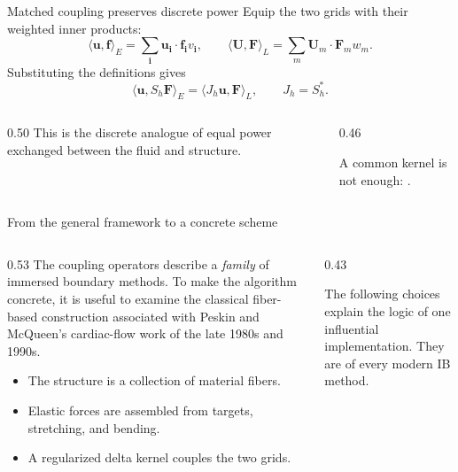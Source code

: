 \documentclass[aspectratio=169,11pt]{beamer}
\newcommand{\uvec}{\bm{u}}
\newcommand{\Fvec}{\bm{F}}
\newcommand{\fvec}{\bm{f}}
\begin{document}
\begin{frame}{Matched coupling preserves discrete power}
Equip the two grids with their weighted inner products:
\[
  \langle \uvec,\fvec\rangle_E
  =\sum_{\bm{i}}\uvec_{\bm{i}}\!\cdot\!\fvec_{\bm{i}}v_{\bm{i}},
  \qquad
  \langle \bm{U},\Fvec\rangle_L
  =\sum_m \bm{U}_m\!\cdot\!\Fvec_mw_m.
\]
Substituting the definitions gives
\[
  \boxed{\langle \uvec,S_h\Fvec\rangle_E
  =\langle J_h\uvec,\Fvec\rangle_L},
  \qquad J_h=S_h^*.
\]
\begin{columns}[T,onlytextwidth]
\begin{column}{0.50\textwidth}
This is the discrete analogue of equal power exchanged between the fluid and structure.
\end{column}
\begin{column}{0.46\textwidth}
\begin{punchbox}
A common kernel is not enough: .
\end{punchbox}
\end{column}
\end{columns}
\end{frame}

\begin{frame}{From the general framework to a concrete scheme}
\begin{columns}[T,onlytextwidth]
\begin{column}{0.53\textwidth}
The coupling operators describe a \emph{family} of immersed boundary methods. To make the algorithm concrete, it is useful to examine the classical fiber-based construction associated with Peskin and McQueen's cardiac-flow work of the late 1980s and 1990s.
\medskip
\begin{itemize}\itemsep5pt
  \item The structure is a collection of material fibers.
  \item Elastic forces are assembled from targets, stretching, and bending.
  \item A regularized delta kernel couples the two grids.
\end{itemize}
\end{column}
\begin{column}{0.43\textwidth}
\begin{punchbox}
The following choices explain the logic of one influential implementation. They are  of every modern IB method.
\end{punchbox}
\end{column}
\end{columns}
\vfill
{}
\end{frame}
\end{document}
